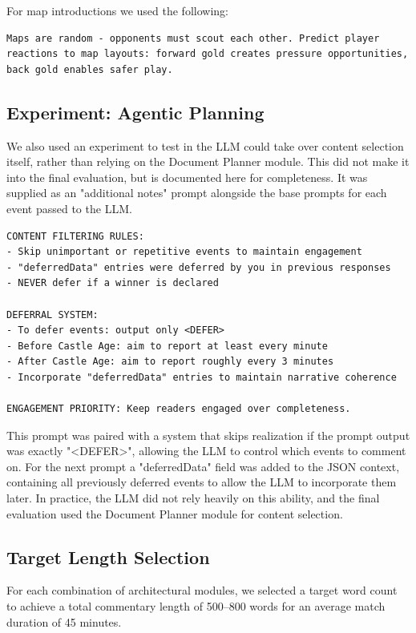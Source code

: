For map introductions we used the following:
\begin{verbatim}
Maps are random - opponents must scout each other. Predict player
reactions to map layouts: forward gold creates pressure opportunities,
back gold enables safer play.
\end{verbatim}

\subsection{Experiment: Agentic Planning}
We also used an experiment to test in the LLM could take over content selection itself, rather than relying on the Document Planner module. This did not make it into the final evaluation, but is documented here for completeness. It was supplied as an "additional notes" prompt alongside the base prompts for each event passed to the LLM.

\begin{verbatim}
CONTENT FILTERING RULES:
- Skip unimportant or repetitive events to maintain engagement
- "deferredData" entries were deferred by you in previous responses
- NEVER defer if a winner is declared

DEFERRAL SYSTEM:
- To defer events: output only <DEFER>
- Before Castle Age: aim to report at least every minute
- After Castle Age: aim to report roughly every 3 minutes
- Incorporate "deferredData" entries to maintain narrative coherence

ENGAGEMENT PRIORITY: Keep readers engaged over completeness.
\end{verbatim}

This prompt was paired with a system that skips realization if the prompt output was exactly "<DEFER>", allowing the LLM to control which events to comment on. For the next prompt a "deferredData" field was added to the JSON context, containing all previously deferred events to allow the LLM to incorporate them later.
In practice, the LLM did not rely heavily on this ability, and the final evaluation used the Document Planner module for content selection.

\subsection{Target Length Selection}
For each combination of architectural modules, we selected a target word count to achieve a total commentary length of 500–800 words for an average match duration of 45 minutes.

